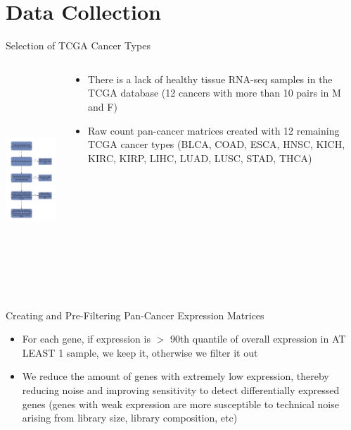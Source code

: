 \documentclass{beamer}
\begin{document}
	\section{Data Collection}
	\begin{frame}{Selection of TCGA Cancer Types}
			\begin{columns}
				\begin{column}{0.45\textwidth}
					\includegraphics[width=5cm, height=8cm]{img3.png}
				\end{column}
				\begin{column}{0.5\textwidth}
					\begin{itemize}
						\item There is a lack of healthy tissue RNA-seq samples in the TCGA database (12 cancers with more than 10 pairs in M and F)
						\item Raw count pan-cancer matrices created with 12 remaining TCGA cancer types (BLCA, COAD, ESCA, HNSC, KICH, KIRC, KIRP, LIHC, LUAD, LUSC, STAD, THCA)
					\end{itemize}
				\end{column}
			\end{columns}			
	\end{frame}

	\begin{frame}{Creating and Pre-Filtering Pan-Cancer Expression Matrices}
		\begin{itemize}
			\item For each gene, if expression is $>$ 90th quantile of overall expression in AT LEAST 1 sample, we keep it, otherwise we filter it out
			\item We reduce the amount of genes with extremely low expression, thereby reducing noise and improving sensitivity to detect differentially expressed genes (genes with weak expression are more susceptible to technical noise arising from library size, library composition, etc)
		\end{itemize}
	\end{frame}
\end{document}
